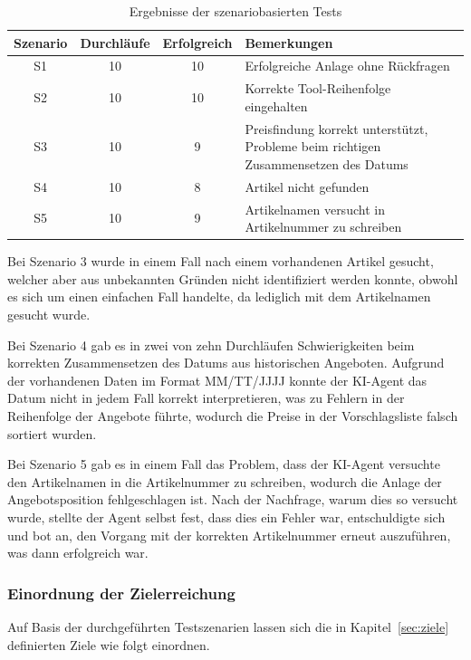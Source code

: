 \begin{table}[H]
\centering
\caption{Ergebnisse der szenariobasierten Tests}
\label{tab:testergebnisse}
\begin{tabular}{|c|c|c|p{7cm}|}
\hline
\textbf{Szenario} & \textbf{Durchläufe} & \textbf{Erfolgreich} & \textbf{Bemerkungen} \\
\hline
S1 & 10 & 10 & Erfolgreiche Anlage ohne Rückfragen \\
\hline
S2 & 10 & 10 & Korrekte Tool-Reihenfolge eingehalten \\
\hline
S3 & 10 & 9 & Preisfindung korrekt unterstützt, Probleme beim richtigen Zusammensetzen des Datums \\
\hline
S4 & 10 & 8 & Artikel nicht gefunden \\
\hline
S5 & 10 & 9 & Artikelnamen versucht in Artikelnummer zu schreiben \\
\hline
\end{tabular}
\end{table}

Bei Szenario 3 wurde in einem Fall nach einem vorhandenen Artikel gesucht, welcher aber aus unbekannten Gründen nicht identifiziert werden konnte, obwohl es sich um einen einfachen Fall handelte, da lediglich mit dem Artikelnamen gesucht wurde.

Bei Szenario 4 gab es in zwei von zehn Durchläufen Schwierigkeiten beim korrekten Zusammensetzen des Datums aus historischen Angeboten. Aufgrund der vorhandenen Daten im Format \glqq{}MM/TT/JJJJ\grqq{} konnte der \ac{KI}-Agent das Datum nicht in jedem Fall korrekt interpretieren, was zu Fehlern in der Reihenfolge der Angebote führte, wodurch die Preise in der Vorschlagsliste falsch sortiert wurden.

Bei Szenario 5 gab es in einem Fall das Problem, dass der \ac{KI}-Agent versuchte den Artikelnamen in die Artikelnummer zu schreiben, wodurch die Anlage der Angebotsposition fehlgeschlagen ist. Nach der Nachfrage, warum dies so versucht wurde, stellte der Agent selbst fest, dass dies ein Fehler war, entschuldigte sich und bot an, den Vorgang mit der korrekten Artikelnummer erneut auszuführen, was dann erfolgreich war.

\subsubsection{Einordnung der Zielerreichung}

Auf Basis der durchgeführten Testszenarien lassen sich die in Kapitel~\ref{sec:ziele} definierten Ziele wie folgt einordnen.


